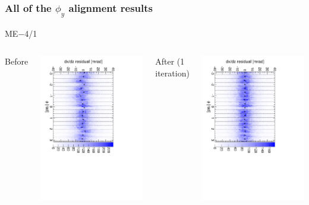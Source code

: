 \documentclass[compress]{beamer}
\begin{document}
\begin{frame}
\frametitle{All of the $\phi_y$ alignment results}
\begin{center}
ME$-$4/1
\end{center}

\begin{columns}
\centering Before

\includegraphics[height=\linewidth, angle=90]{iter01_mem41.pdf}

\centering After (1 iteration)

\includegraphics[height=\linewidth, angle=90]{iter02_mem41.pdf}
\end{columns}


\end{frame}
\end{document}
